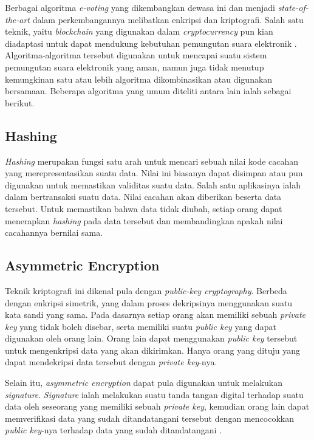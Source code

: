 Berbagai algoritma \textit{e-voting} yang dikembangkan dewasa ini dan menjadi \textit{state-of-the-art} dalam perkembangannya melibatkan enkripsi dan kriptografi. Salah satu teknik, yaitu \textit{blockchain} yang digunakan dalam \textit{cryptocurrency} pun kian diadaptasi untuk dapat mendukung kebutuhan pemungutan suara elektronik \citep{8651451}. Algoritma-algoritma tersebut digunakan untuk mencapai suatu sistem pemungutan suara elektronik yang aman, namun juga tidak menutup kemungkinan satu atau lebih algoritma dikombinasikan atau digunakan bersamaan. Beberapa algoritma yang umum diteliti antara lain ialah sebagai berikut.

\subsection{Hashing}

\textit{Hashing} merupakan fungsi satu arah untuk mencari sebuah nilai kode cacahan yang merepresentasikan suatu data. Nilai ini biasanya dapat disimpan atau pun digunakan untuk memastikan validitas suatu data. Salah satu aplikasinya ialah dalam bertransaksi suatu data. Nilai cacahan akan diberikan beserta data tersebut. Untuk memastikan bahwa data tidak diubah, setiap orang dapat menerapkan \textit{hashing} pada data tersebut dan membandingkan apakah nilai cacahannya bernilai sama.

\subsection{Asymmetric Encryption}

Teknik kriptografi ini dikenal pula dengan \textit{public-key cryptography}. Berbeda dengan enkripsi simetrik, yang dalam proses dekripsinya menggunakan suatu kata sandi yang sama. Pada dasarnya setiap orang akan memiliki sebuah \textit{private key} yang tidak boleh disebar, serta memiliki suatu \textit{public key} yang dapat digunakan oleh orang lain. Orang lain dapat menggunakan \textit{public key} tersebut untuk mengenkripsi data yang akan dikirimkan. Hanya orang yang dituju yang dapat mendekripsi data tersebut dengan \textit{private key}-nya.

Selain itu, \textit{asymmetric encryption} dapat pula digunakan untuk melakukan \textit{signature}. \textit{Signature} ialah melakukan suatu tanda tangan digital terhadap suatu data oleh seseorang yang memiliki sebuah \textit{private key}, kemudian orang lain dapat memverifikasi data yang sudah ditandatangani tersebut dengan mencocokkan \textit{public key}-nya terhadap data yang sudah ditandatangani \citep{pubkey}.

